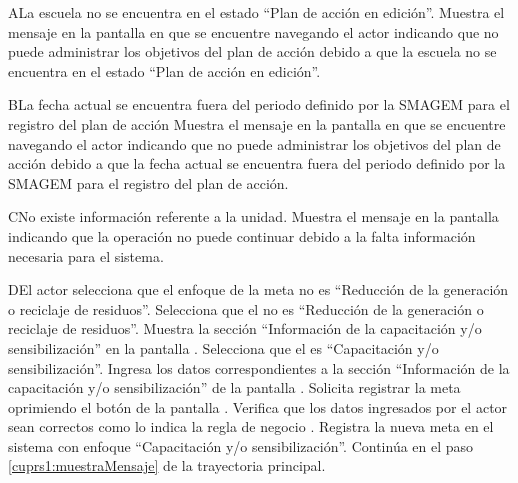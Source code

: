 \begin{UCtrayectoriaA}{A}{La escuela no se encuentra en el estado ``Plan de acción en edición''.}
    \UCpaso[\UCsist] Muestra el mensaje  en la pantalla en que se encuentre navegando el actor indicando que no puede administrar los objetivos del plan de acción debido a que la escuela no se encuentra en el estado ``Plan de acción en edición''. 
 \end{UCtrayectoriaA}
 
   \begin{UCtrayectoriaA}{B}{La fecha actual se encuentra fuera del periodo definido por la SMAGEM para el registro del plan de acción}
    \UCpaso[\UCsist] Muestra el mensaje  en la pantalla en que se encuentre navegando el actor indicando que no puede administrar los objetivos del plan de acción debido a que la fecha actual se encuentra fuera del periodo definido por la SMAGEM para el registro del plan de acción.
 \end{UCtrayectoriaA}
 
\begin{UCtrayectoriaA}{C}{No existe información referente a la unidad.}
	\UCpaso[\UCsist] Muestra el mensaje  en la pantalla  indicando que la operación no puede continuar debido a la falta información necesaria para el sistema.
\end{UCtrayectoriaA}

\begin{UCtrayectoriaA}{D}{El actor selecciona que el enfoque de la meta no es ``Reducción de la generación o reciclaje de residuos''.}
	\UCpaso[\UCactor] Selecciona que el  no es ``Reducción de la generación o reciclaje de residuos''. 
	\UCpaso[\UCsist] Muestra la sección ``Información de la capacitación y/o sensibilización'' en la pantalla .
	\UCpaso[\UCactor] Selecciona que el  es ``Capacitación y/o sensibilización''. 
	\UCpaso[\UCactor] Ingresa los datos correspondientes a la sección ``Información de la capacitación y/o sensibilización'' de la pantalla .
	\UCpaso[\UCactor] Solicita registrar la meta oprimiendo el botón  de la pantalla .  
	\UCpaso[\UCsist] Verifica que los datos ingresados por el actor sean correctos como lo indica la regla de negocio .   
	\UCpaso[\UCsist] Registra la nueva meta en el sistema con enfoque ``Capacitación y/o sensibilización''.
	\UCpaso[] Continúa en el paso \ref{cuprs1:muestraMensaje} de la trayectoria principal.
\end{UCtrayectoriaA}


